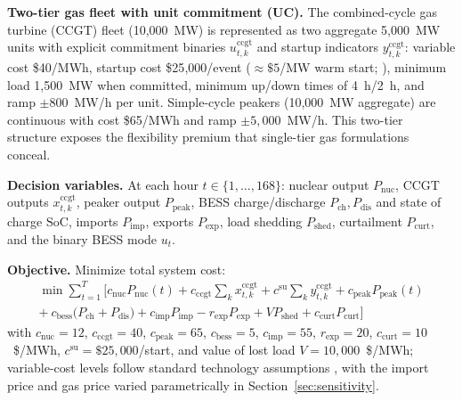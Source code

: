\documentclass[preprint,12pt,authoryear]{elsarticle}
\begin{document}
\textbf{Two-tier gas fleet with unit commitment (UC).} The combined-cycle gas turbine (CCGT) fleet (10{,}000~MW) is represented as two aggregate 5{,}000~MW units with explicit commitment binaries $u^{\text{ccgt}}_{t,k}$ and startup indicators $y^{\text{ccgt}}_{t,k}$: variable cost \$40/MWh, startup cost \$25{,}000/event (${\approx}\$5$/MW warm start; \citealp{nrelatb2023}), minimum load 1{,}500~MW when committed, minimum up/down times of 4~h/2~h, and ramp $\pm 800$~MW/h per unit. Simple-cycle peakers (10{,}000~MW aggregate) are continuous with cost \$65/MWh and ramp $\pm 5{,}000$~MW/h. This two-tier structure exposes the flexibility premium that single-tier gas formulations conceal.

\textbf{Decision variables.} At each hour $t \in \{1,\ldots,168\}$: nuclear output $P_{\text{nuc}}$, CCGT outputs $x^{\text{ccgt}}_{t,k}$, peaker output $P_{\text{peak}}$, BESS charge/discharge $P_{\text{ch}}, P_{\text{dis}}$ and state of charge $\mathrm{SoC}$, imports $P_{\text{imp}}$, exports $P_{\text{exp}}$, load shedding $P_{\text{shed}}$, curtailment $P_{\text{curt}}$, and the binary BESS mode $u_t$.

\textbf{Objective.} Minimize total system cost:
\begin{multline}
\label{eq:obj}
\min \sum_{t=1}^{T} \Big[ c_{\text{nuc}} P_{\text{nuc}}(t) + c_{\text{ccgt}} \!\sum_k x^{\text{ccgt}}_{t,k} + c^{\text{su}} \!\sum_k y^{\text{ccgt}}_{t,k} + c_{\text{peak}} P_{\text{peak}}(t) \\
+\ c_{\text{bess}}\big(P_{\text{ch}} + P_{\text{dis}}\big) + c_{\text{imp}} P_{\text{imp}} - r_{\text{exp}} P_{\text{exp}} + V P_{\text{shed}} + c_{\text{curt}} P_{\text{curt}} \Big]
\end{multline}
with $c_{\text{nuc}} = 12$, $c_{\text{ccgt}} = 40$, $c_{\text{peak}} = 65$, $c_{\text{bess}} = 5$, $c_{\text{imp}} = 55$, $r_{\text{exp}} = 20$, $c_{\text{curt}} = 10$~\$/MWh, $c^{\text{su}} = \$25{,}000$/start, and value of lost load $V = 10{,}000$~\$/MWh; variable-cost levels follow standard technology assumptions \citep{nrelatb2023}, with the import price and gas price varied parametrically in Section~\ref{sec:sensitivity}.
\end{document}
